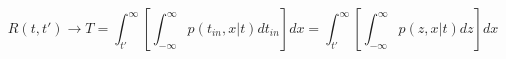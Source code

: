 \begin{equation}
R(t,t') \to T= \int_{t'}^\infty \left[ \int_{-\infty}^\infty p(t_{in},x|t) dt_{in} \right]  dx = \int_{t'}^\infty \left[ \int_{-\infty}^\infty p(z,x|t) dz \right] dx
\end{equation}